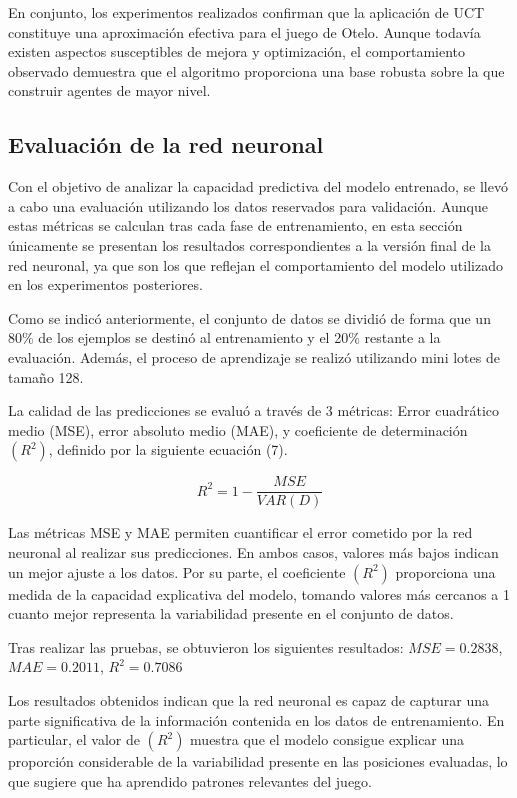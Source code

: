 \documentclass[conference,a4paper]{IEEEtran}
\begin{document}
En conjunto, los experimentos realizados confirman que la aplicación de UCT constituye una aproximación efectiva para el juego de Otelo. 
Aunque todavía existen aspectos susceptibles de mejora y optimización, el comportamiento observado demuestra que el algoritmo proporciona una base robusta sobre la que construir agentes de mayor nivel. 

\subsection{Evaluación de la red neuronal} 
Con el objetivo de analizar la capacidad predictiva del modelo entrenado, se llevó a cabo una evaluación utilizando los datos reservados para validación. Aunque estas métricas se calculan tras cada fase de entrenamiento, en esta sección únicamente se presentan los resultados correspondientes a la versión final de la red neuronal, ya que son los que reflejan el comportamiento del modelo utilizado en los experimentos posteriores. 

Como se indicó anteriormente, el conjunto de datos se dividió de forma que un 80\% de los ejemplos se destinó al entrenamiento y el 20\% restante a la evaluación. 
Además, el proceso de aprendizaje se realizó utilizando mini lotes de tamaño 128. 

La calidad de las predicciones se evaluó a través de 3 métricas: Error cuadrático medio (MSE), error absoluto medio (MAE), y coeficiente de determinación $(R^{2})$, definido por la siguiente ecuación (7). 

\begin{equation}
  \label{eq:r2}
  R^{2}=1-\frac{MSE}{VAR(D)} 
\end{equation}

Las métricas MSE y MAE permiten cuantificar el error cometido por la red neuronal al realizar sus predicciones. 
En ambos casos, valores más bajos indican un mejor ajuste a los datos. 
Por su parte, el coeficiente $(R^{2})$ proporciona una medida de la capacidad explicativa del modelo, tomando valores más cercanos a 1 cuanto mejor representa la variabilidad presente en el conjunto de datos. 

Tras realizar las pruebas, se obtuvieron los siguientes resultados: $MSE=0.2838$, $MAE=0.2011$, $R^{2}=0.7086$ 

Los resultados obtenidos indican que la red neuronal es capaz de capturar una parte significativa de la información contenida en los datos de entrenamiento. 
En particular, el valor de $(R^{2})$ muestra que el modelo consigue explicar una proporción considerable de la variabilidad presente en las posiciones evaluadas, lo que sugiere que ha aprendido patrones relevantes del juego. 
\end{document}
